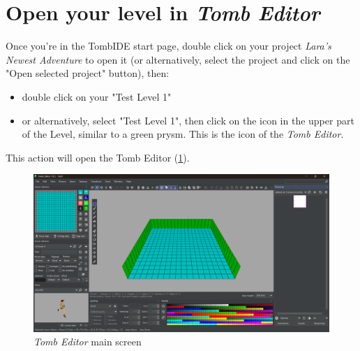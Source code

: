 \section{Open your level in \emph{Tomb Editor}}
Once you're in the TombIDE start page, double click on your project \emph{Lara's Newest Adventure} to open it (or alternatively, select the project and click on the "Open selected project" button), then:
\begin{itemize}
    \item double click on your "Test Level 1"
    \item or alternatively, select "Test Level 1", then click on the icon in the upper part of the Level, similar to a green prysm. This is the icon of the \emph{Tomb Editor}.
\end{itemize}
This action will open the Tomb Editor (\ref{fig:te1000}).

\begin{figure}
    \centering
     \includegraphics[width=1\textwidth]{screenshots/1000.png}
     \caption{\emph{Tomb Editor} main screen}
     \label{fig:te1000} 
\end{figure}

